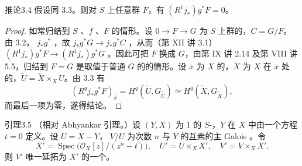 \begin{SGAresult}{推论}{3.4}
假设同 3.3。则对 $S$ 上任意群 $F$，有 $(R^1j_*)g^*F=0$。
\end{SGAresult}
\begin{proof}
如常归结到 $S$ 、$f$ 、$F$ 的情形。设 $0\to F\to G$ 为 $S$ 上群的，$C=G/F$。由 3.2， $j_*g^*$ ，故 $j_*g^*G\to j_*g^*C$ ，从而（第 XII 讲 3.1）$(R^1j_*)g^*F\to(R^1j_*)g^*G$ 。因此可把 $F$ 换成 $G$，由第 IX 讲 2.14 及第 VIII 讲 5.5，归结到 $F=G$ 是取值于普通 $G$ 的的情形。设 $\bar x$ 为 $X$ 的，$\widetilde X$ 为 $X$ 在 $\bar x$ 处的，$\widetilde U=\widetilde X\times_XU$。由 3.3 有
\[
(R^qj_*g^*F)_{\bar x}=H^q(\widetilde U,G_{\widetilde U})\simeq H^q(\widetilde X,G_{\widetilde X}),
\]
而最后一项为零，遂得结论。
\end{proof}
\begin{SGAresult}{引理}{3.5}
（相对 Abhyankar 引理。）设 $(Y,X)$ 为 $1$ 的 $S$-，$Y$ 在 $X$ 中由一个方程 $t=0$ 定义。设 $U=X-Y$，
$V/U$ 为次数 $n$ 与 $Y$ 的互素的主 Galois 。令
\[
X'=\operatorname{Spec}\bigl(\mathcal O_X[z]/(z^n-t)\bigr),\quad U'=U\times_XX',\quad V'=V\times_XX'.
\]
则 $V'$ 唯一延拓为 $X'$ 的一个。
\end{SGAresult}

